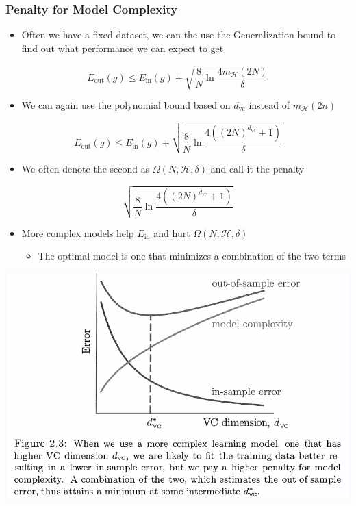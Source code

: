 \documentclass[11pt]{article}
\begin{document}
\subsubsection{Penalty for Model Complexity}
\label{sec:org571d86c}
\begin{itemize}
\item Often we have a fixed dataset, we can the use the Generalization bound to find out what performance we can expect to get
\end{itemize}
\begin{equation}
	  E_\text{out}(g) \leq E_\text{in}(g) + \sqrt{\frac8N\ln\frac{4m_\mathcal{H}(2N)}\delta}  
\end{equation}
\begin{itemize}
\item We can again use the polynomial bound based on \(d_\text{vc}\) instead of \(m_\mathcal H(2n)\)
\end{itemize}
\begin{equation}
	  E_\text{out}(g) \leq E_\text{in}(g) + \sqrt{\frac8N\ln\frac{4((2N)^{d_\text{vc}} + 1)}\delta}  
\end{equation}

\begin{itemize}
\item We often denote the second as \(\Omega(N,\mathcal H, \delta)\) and call it the penalty
\end{itemize}
\begin{equation}
  \sqrt{\frac8N\ln\frac{4((2N)^{d_\text{vc}} + 1)}\delta}  
\end{equation}

\begin{itemize}
\item More complex models help \(E_\text{in}\) and hurt \(\Omega(N,\mathcal H, \delta)\)
\begin{itemize}
\item The optimal model is one that minimizes a combination of the two terms
\end{itemize}
\end{itemize}

\begin{center}
\includegraphics[width=.9\linewidth]{Training versus Testing (2)/screenshot_2018-09-12_19-20-23.png}
\end{center}
\end{document}
